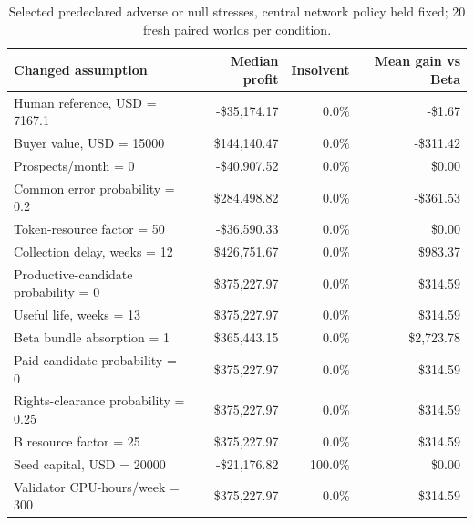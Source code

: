 \begin{table}[!htbp]\centering\small
\caption{Selected predeclared adverse or null stresses, central network policy held fixed; 20 fresh paired worlds per condition.}
\begin{tabularx}{\linewidth}{Yrrr}\toprule
Changed assumption & Median profit & Insolvent & Mean gain vs Beta\\\midrule
Human reference, USD = 7167.1 & -\$35,174.17 & 0.0\% & -\$1.67\\
Buyer value, USD = 15000 & \$144,140.47 & 0.0\% & -\$311.42\\
Prospects/month = 0 & -\$40,907.52 & 0.0\% & \$0.00\\
Common error probability = 0.2 & \$284,498.82 & 0.0\% & -\$361.53\\
Token-resource factor = 50 & -\$36,590.33 & 0.0\% & \$0.00\\
Collection delay, weeks = 12 & \$426,751.67 & 0.0\% & \$983.37\\
Productive-candidate probability = 0 & \$375,227.97 & 0.0\% & \$314.59\\
Useful life, weeks = 13 & \$375,227.97 & 0.0\% & \$314.59\\
Beta bundle absorption = 1 & \$365,443.15 & 0.0\% & \$2,723.78\\
Paid-candidate probability = 0 & \$375,227.97 & 0.0\% & \$314.59\\
Rights-clearance probability = 0.25 & \$375,227.97 & 0.0\% & \$314.59\\
B resource factor = 25 & \$375,227.97 & 0.0\% & \$314.59\\
Seed capital, USD = 20000 & -\$21,176.82 & 100.0\% & \$0.00\\
Validator CPU-hours/week = 300 & \$375,227.97 & 0.0\% & \$314.59\\
\bottomrule
\end{tabularx}
\par{}\par
\end{table}
